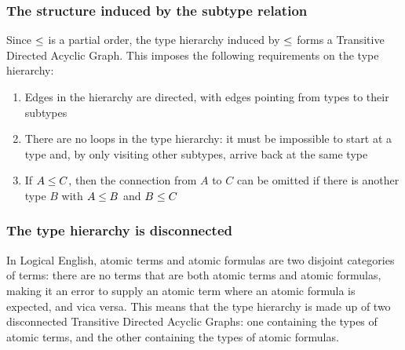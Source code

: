 \documentclass[../main.tex]{subfiles}
\begin{document}
\subsubsection{The structure induced by the subtype relation}
Since $\leq$ is a partial order, the type hierarchy induced by $\leq$ forms a Transitive Directed Acyclic Graph\cite[p.~49]{poset_dag}. This imposes the following requirements on the type hierarchy:
\begin{enumerate}
    \item Edges in the hierarchy are directed, with edges pointing from types to their subtypes
    \item There are no loops in the type hierarchy: it must be impossible to start at a type and, by only visiting other subtypes, arrive back at the same type
    \item If $A \leq C$, then the connection from $A$ to $C$ can be omitted if there is another type $B$ with $A \leq B$ and $B \leq C$
\end{enumerate}

\subsubsection{The type hierarchy is disconnected}
In Logical English, atomic terms and atomic formulas are two disjoint categories of terms: there are no terms that are both atomic terms and atomic formulas, making it an error to supply an atomic term where an atomic formula is expected, and vica versa. This means that the type hierarchy is made up of two disconnected Transitive Directed Acyclic Graphs: one containing the types of atomic terms, and the other containing the types of atomic formulas.
\end{document}
